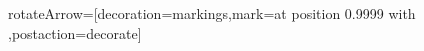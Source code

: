 \documentclass[]{article}
\begin{document}
	
	\tikzstyle rotateArrow=[decoration={markings,mark=at position 0.9999 with {\arrow[scale=1,>=triangle 45]{>}}},postaction={decorate}]
	
	
	
\end{document}
